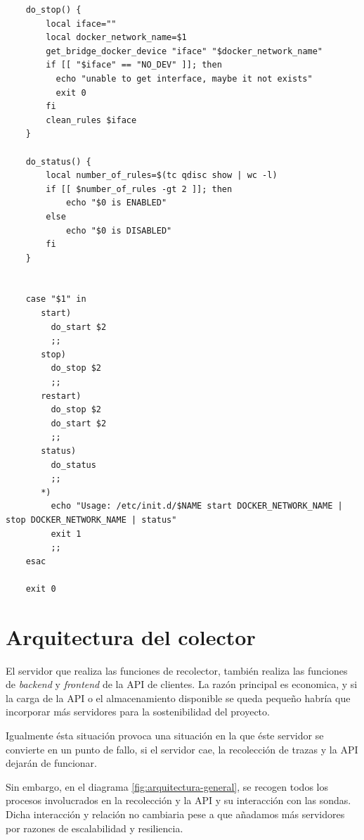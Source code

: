 \begin{verbatim}
    do_stop() {
        local iface=""
        local docker_network_name=$1
        get_bridge_docker_device "iface" "$docker_network_name"
        if [[ "$iface" == "NO_DEV" ]]; then
          echo "unable to get interface, maybe it not exists"
          exit 0
        fi
        clean_rules $iface
    }
    
    do_status() {
        local number_of_rules=$(tc qdisc show | wc -l)
        if [[ $number_of_rules -gt 2 ]]; then
            echo "$0 is ENABLED"
        else
            echo "$0 is DISABLED"
        fi
    }
    
    
    case "$1" in
       start)
         do_start $2
         ;;
       stop)
         do_stop $2
         ;;
       restart)
         do_stop $2
         do_start $2
         ;;
       status)
         do_status
         ;;
       *)
         echo "Usage: /etc/init.d/$NAME start DOCKER_NETWORK_NAME | stop DOCKER_NETWORK_NAME | status"
         exit 1
         ;;
    esac
    
    exit 0    
\end{verbatim}
\bigskip


\section{Arquitectura del colector}

El servidor que realiza las funciones de recolector, también realiza las funciones
de \emph{backend} y \emph{frontend} de la API de clientes. La razón principal
es economica, y si la carga de la API o el almacenamiento disponible se queda pequeño
habría que incorporar más servidores para la sostenibilidad del proyecto.

Igualmente ésta situación provoca una situación en la que éste servidor se convierte en un 
punto de fallo, si el servidor cae, la recolección de trazas y la API dejarán de funcionar.

Sin embargo, en el diagrama \ref{fig:arquitectura-general}, se recogen todos los procesos involucrados
en la recolección y la API y su interacción con las sondas. Dicha interacción y relación no cambiaria pese
a que añadamos más servidores por razones de escalabilidad y resiliencia.

